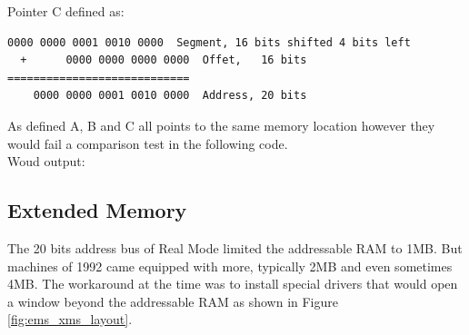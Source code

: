 \documentclass[book.tex]{subfiles}
\begin{document}
\bigskip

Pointer C defined as:
\begin{Verbatim}[fontsize=\relsize{-1}]
    0000 0000 0001 0010 0000  Segment, 16 bits shifted 4 bits left  
  +      0000 0000 0000 0000  Offet,   16 bits
============================
    0000 0000 0001 0010 0000  Address, 20 bits
\end{Verbatim}

As defined A, B and C all points to the same memory location however they would fail a comparison test in the following code.\\



Woud output:




\bigskip





  \subsection{Extended Memory}

The 20 bits address bus of Real Mode limited the addressable RAM to 1MB. But machines of 1992 came equipped with more, typically 2MB and even sometimes 4MB. The workaround at the time was to install special drivers that would open a window beyond the addressable RAM as shown in Figure \ref{fig:ems_xms_layout}.
\end{document}
